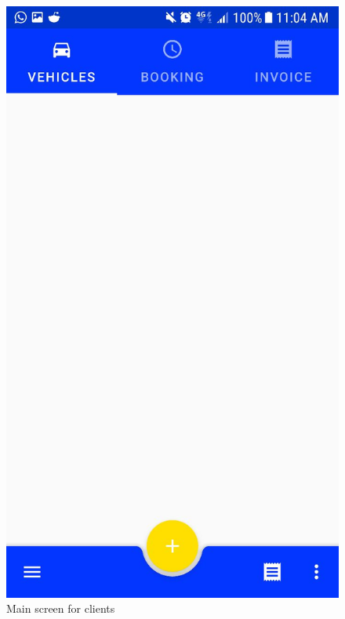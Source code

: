 \begin{figure}[h!]
  \centering
  \begin{minipage}[b]{0.4\textwidth}
    \includegraphics[width=\textwidth]{main_screen.jpg}
    \caption{Main screen for clients}
  \end{minipage}
  \hfill
  \begin{minipage}[b]{0.4\textwidth}

\end{minipage}
\end{figure}
